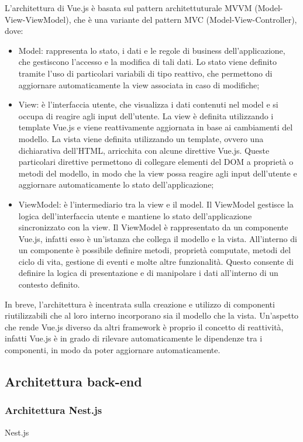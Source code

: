 L'architettura di Vue.js è basata sul pattern architettuturale MVVM (Model-View-ViewModel), che è una variante del pattern MVC (Model-View-Controller), dove:
\begin{itemize}
  \item Model: rappresenta lo stato, i dati e le regole di business dell'applicazione, che gestiscono l'accesso e la modifica di tali dati. Lo stato viene definito tramite l'uso
  di particolari variabili di tipo reattivo, che permettono di aggiornare automaticamente la view associata in caso di modifiche;
  \item View: è l'interfaccia utente, che visualizza i dati contenuti nel model e si occupa di reagire agli input dell'utente.
  La view è definita utilizzando i template Vue.js e viene reattivamente aggiornata in base ai cambiamenti del modello. La vista viene definita utilizzando un template, ovvero una dichiarativa dell'HTML, arricchita con alcune direttive Vue.js. 
  Queste particolari direttive permettono di collegare elementi del DOM a proprietà o metodi del modello, in modo che la view possa reagire agli input dell'utente e aggiornare automaticamente lo stato dell'applicazione;
  \item ViewModel: è l'intermediario tra la view e  il model. Il ViewModel gestisce la logica dell'interfaccia utente e mantiene lo stato dell'applicazione sincronizzato con la view.
  Il ViewModel è rappresentato da un componente Vue.js, infatti esso è un'istanza che collega il modello e la vista. All'interno di un componente è possibile definire metodi, proprietà 
  computate, metodi del ciclo di vita, gestione di eventi e molte altre funzionalità. Questo consente di definire la logica di presentazione e di manipolare i dati all'interno di un contesto definito.
\end{itemize}

In breve, l'architettura è incentrata sulla creazione e utilizzo di componenti riutilizzabili che al loro interno incorporano sia il modello che la vista. Un'aspetto che rende Vue.js
diverso da altri framework è proprio il concetto di reattività, infatti Vue.js è in grado di rilevare automaticamente le dipendenze tra i componenti, in modo da poter aggiornare automaticamente.

\subsection{Architettura back-end}\label{subsec:architettura-back-end}
\subsubsection{Architettura Nest.js}\label{subsubsec:architettura-nest.js}
Nest.js 

